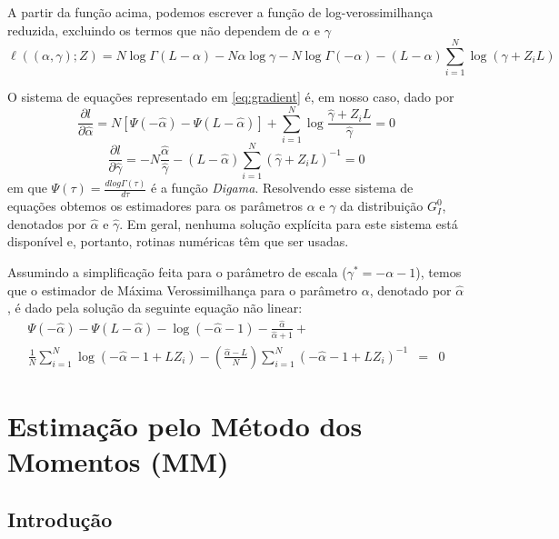A partir da função acima, podemos escrever a função de log-verossimilhança reduzida, excluindo os termos que não dependem de $\alpha$ e $\gamma$
\begin{equation}
    \ell ((\alpha, \gamma); Z) = N\log\Gamma(L-\alpha) - N\alpha \log\gamma - N\log\Gamma(-\alpha) - (L-\alpha)\sum_{i=1}^{N}\log(\gamma +Z_iL) \label{eq:logVerRed}
\end{equation}

O sistema de equações representado em \eqref{eq:gradient} é, em nosso caso, dado por
\begin{equation}
  \frac{\partial l}{\partial \widehat{\alpha}} = N[\Psi(-\widehat{\alpha}) - \Psi(L-\widehat{\alpha})] + \sum_{i=1}^{N}\log\frac{\widehat{\gamma} + Z_iL}{\widehat{\gamma}} = 0
\end{equation}
\begin{equation}
   \frac{\partial l}{\partial \widehat{\gamma}} = -N\frac{\widehat{\alpha}}{\widehat{\gamma}} - (L - \widehat{\alpha})\sum_{i=1}^{N}(\widehat{\gamma} + Z_iL)^{-1} = 0
\end{equation}
em que $\Psi(\tau) = \frac{\textit{d}log\Gamma(\tau)}{\textit{d}\tau}$ é a função \textit{Digama}. Resolvendo esse sistema de equações obtemos os estimadores para os parâmetros $\alpha$ e $\gamma$ da distribuição $G_I^0$, denotados por $\widehat{\alpha}$ e $\widehat{\gamma}$. Em geral, nenhuma solução explícita para este sistema está disponível e, portanto, rotinas numéricas têm que ser usadas.

Assumindo a simplificação feita para o parâmetro de escala ($\gamma^{*} = -\alpha - 1$), temos que o estimador de Máxima Verossimilhança para o parâmetro $\alpha$, denotado por $\widehat{\alpha}$, é dado pela solução da seguinte equação não linear:
\begin{eqnarray}
    \Psi(-\widehat{\alpha}) - \Psi(L-\widehat{\alpha}) - \log(-\widehat{\alpha}-1) - \frac{\widehat{\alpha}}{\widehat{\alpha}+1} + \nonumber \\ \frac{1}{N}\sum_{i=1}^{N}\log(-\widehat{\alpha} - 1 + LZ_i) - \left ( \frac{\widehat{\alpha}-L}{N} \right )\sum_{i=1}^{N}(-\widehat{\alpha} - 1 + LZ_i)^{-1} & = & 0
\end{eqnarray}

\section{Estimação pelo Método dos Momentos (MM)}

\subsection{Introdução}

